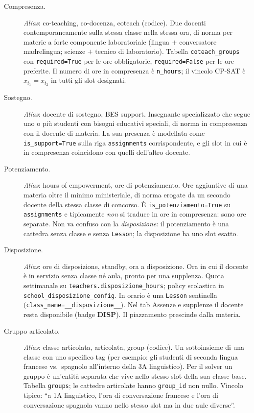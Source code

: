 \begin{description}
\item[Compresenza.]
  \emph{Alias}: co-teaching, co-docenza, coteach (codice).
  Due docenti contemporaneamente sulla stessa classe nella
  stessa ora, di norma per materie a forte componente
  laboratoriale (lingua $+$ conversatore madrelingua;
  scienze $+$ tecnico di laboratorio). Tabella
  \texttt{coteach\_groups} con \texttt{required=True}
  per le ore obbligatorie, \texttt{required=False} per le
  ore preferite. Il numero di ore in compresenza \`e
  \texttt{n\_hours}; il vincolo CP-SAT \`e
  $x_{t_1} = x_{t_2}$ in tutti gli slot designati.

\item[Sostegno.]
  \emph{Alias}: docente di sostegno, BES support.
  Insegnante specializzato che segue uno o pi\`u studenti
  con bisogni educativi speciali, di norma in compresenza
  con il docente di materia. La sua presenza \`e modellata
  come \texttt{is\_support=True} sulla riga
  \texttt{assignments} corrispondente, e gli slot in cui
  \`e in compresenza coincidono con quelli dell'altro
  docente.

\item[Potenziamento.]
  \emph{Alias}: hours of empowerment, ore di potenziamento.
  Ore aggiuntive di una materia oltre il minimo
  ministeriale, di norma erogate da un secondo docente
  della stessa classe di concorso. \`E
  \texttt{is\_potenziamento=True} su \texttt{assignments}
  e tipicamente \emph{non} si traduce in ore in compresenza:
  sono ore separate. Non va confuso con la
  \emph{disposizione}: il potenziamento \`e una cattedra
  senza classe e senza \texttt{Lesson}; la disposizione
  ha uno slot esatto.

\item[Disposizione.]
  \emph{Alias}: ore di disposizione, standby, ora a
  disposizione. Ora in cui il docente \`e in servizio senza
  classe n\'e aula, pronto per una supplenza. Quota
  settimanale su \texttt{teachers.disposizione\_hours};
  policy scolastica in
  \texttt{school\_disposizione\_config}. In orario \`e una
  \texttt{Lesson} sentinella
  (\texttt{class\_name=\_\_disposizione\_\_}). Nel tab
  Assenze e supplenze il docente resta disponibile (badge
  \textbf{DISP}). Il piazzamento prescinde dalla materia.

\item[Gruppo articolato.]
  \emph{Alias}: classe articolata, articolata, group (codice).
  Un sottoinsieme di una classe con uno specifico tag (per
  esempio: gli studenti di seconda lingua francese vs.\
  spagnolo all'interno della 3A linguistico). Per il solver
  un gruppo \`e un'entit\`a separata che vive nello stesso
  slot della sua classe-base. Tabella \texttt{groups}; le
  cattedre articolate hanno \texttt{group\_id} non nullo.
  Vincolo tipico: ``a 1A linguistico, l'ora di
  conversazione francese e l'ora di conversazione spagnola
  vanno nello stesso slot ma in due aule diverse''.


\end{description}
